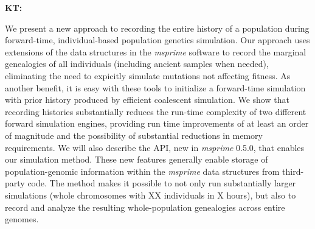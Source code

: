 \documentclass{article}
\begin{document}
\textbf{KT:}

We present a new approach to recording the entire history of a population during forward-time, individual-based
population genetics simulation.  Our approach uses extensions of the data structures in the \emph{msprime} software to
record the marginal genealogies of all individuals (including ancient samples when needed), eliminating the need to
expicitly simulate mutations not affecting fitness.  
As another benefit, it is easy with these tools to initialize a forward-time simulation
with prior history produced by efficient coalescent simulation.
We show that recording histories substantially reduces the run-time
complexity of two different forward simulation engines, providing run time improvements of at least an order of
magnitude and the possibility of substantial reductions in memory requirements.  We will also describe the API, new in
\emph{msprime} 0.5.0, that enables our simulation method.  These new features generally enable storage of
population-genomic information within the \emph{msprime} data structures from third-party code. The method
makes it possible to not only run substantially larger simulations (whole chromosomes with XX individuals in X hours),
but also to record and analyze the resulting whole-population genealogies across entire genomes.
\end{document}
